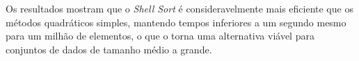 \qquad Os resultados mostram que o \textit{Shell Sort} é consideravelmente mais eficiente que os métodos quadráticos simples, mantendo tempos inferiores a um segundo mesmo para um milhão de elementos, o que o torna uma alternativa viável para conjuntos de dados de tamanho médio a grande.

\FloatBarrier